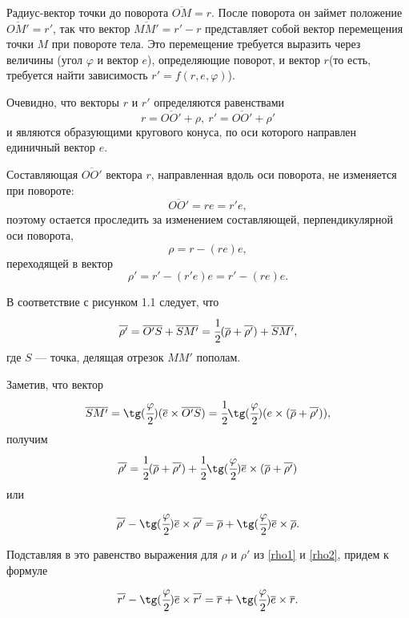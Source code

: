 \documentclass[14pt]{extreport}
\newcommand{\ov}{\overline}
\newcommand{\fr}{\cfrac}
\newcommand{\ti}{\times}
\newcommand{\rw}{\overline{r}}%
\newcommand{\rrw}{\overline{r'}}%
\newcommand{\ew}{\overline{e}}%
\newcommand{\pw}{\overline{\rho}}%
\newcommand{\ppw}{\overline{\rho'}}%
\renewcommand{\phi}{\varphi} %
\begin{document}
Радиус-вектор точки до поворота $\overline{OM}=r$. После поворота он займет положение $\overline{OM'}=r'$, так что вектор $\overline{MM'}=r'-r$ представляет собой вектор перемещения точки $M$ при повороте тела. Это перемещение требуется выразить через величины (угол $\phi$ и вектор $e$), определяю­щие поворот, и вектор $r$(то есть, требуется найти зависимость $r' = f(r, e,\phi)$).

Очевидно, что векторы $r$ и $r'$ определяются равенствами
\begin{equation}
r = \overline{OO'} + \rho,\ r' = \overline{OO'} + \rho'
\end{equation}
и являются образующими кругового конуса, по оси которого направлен единичный вектор $e$.

Составляющая $\overline{OO'}$ вектора $r$, направленная вдоль оси поворота, не изменяется при повороте:
\begin{equation}
\overline{OO'} = re = r'e,
\end{equation}
поэтому остается проследить за изменением составляющей, перпенди­кулярной оси поворота,
\begin{equation}
\label{rho1}
\rho=r-(re)e,
\end{equation}
переходящей в вектор
\begin{equation}
\label{rho2}
\rho'=r'-(r'e)e=r'-(re)e.
\end{equation}

В соответствие с рисунком 1.1 следует, что
\begin{equation}
\ppw = \ov{O'S} + \ov{SM'} = \fr{1}{2}(\pw + \ppw)+\ov{SM'},
\end{equation}
где $S$ — точка, делящая отрезок $MM'$ пополам.

Заметив, что вектор
\begin{equation}
\ov{SM'} = \tg(\fr{\phi}{2})(\ew\ti\ov{O'S}) = \fr{1}{2} \tg(\fr{\phi}{2})(e\times(\pw+\ppw)),
\end{equation}
получим
\begin{equation}
\ppw = \fr{1}{2}(\pw+\ppw) + \fr{1}{2}\tg(\fr{\phi}{2})\ew\ti(\pw+\ppw)
\end{equation}
или
\begin{equation}
\ppw - \tg(\fr{\phi}{2})\ew\ti\ppw = \pw + \tg(\fr{\phi}{2})\ew\ti\pw.
\end{equation}

Подставляя в это равенство выражения для $\rho$ и $\rho'$ из \eqref{rho1} и \eqref{rho2}, придем к формуле
\begin{equation}
\rrw - \tg(\fr{\phi}{2})\ew\ti\rrw = \rw + \tg(\fr{\phi}{2})\ew\ti\rw.
\end{equation}
\end{document}
